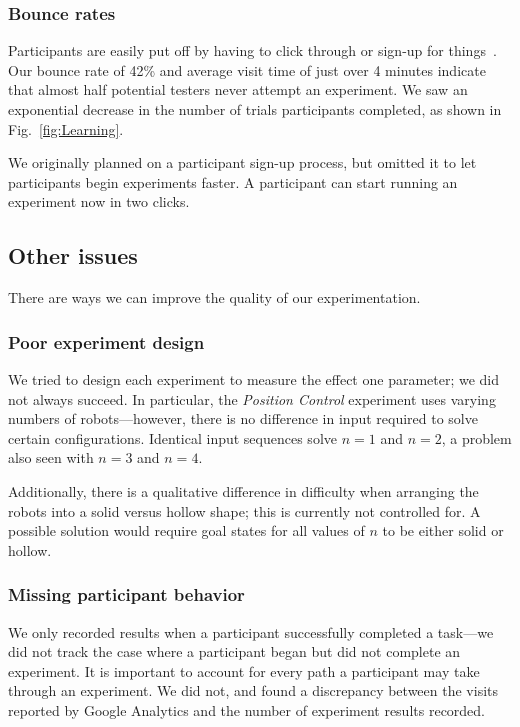 \subsubsection{Bounce rates}
Participants are easily put off by having to click through or sign-up for things~\cite{krug2009don}.  Our bounce rate of 42\% and average visit time of just over 4 minutes indicate that almost half potential testers never attempt an experiment. We saw an exponential decrease in the number of trials participants completed, as shown in Fig.~\ref{fig:Learning}.

We originally planned on a participant sign-up process, but omitted it to let participants begin experiments faster. A participant can start running an experiment now in two clicks.


\subsection{Other issues}

There are ways we can improve the quality of our experimentation.

\subsubsection{Poor experiment design}

We tried to design each experiment to measure the effect one parameter; we did not always succeed. In particular, the \emph{Position Control} experiment uses varying numbers of robots---however, there is no difference in input required to solve certain configurations. Identical input sequences solve $n=1$ and $n=2$, a problem also seen with $n=3$ and $n=4$.

Additionally, there is a qualitative difference in difficulty when arranging the robots into a solid versus hollow shape; this is currently not controlled for. A possible solution would require goal states for all values of $n$ to be either solid or hollow.

\subsubsection{Missing participant behavior}

We only recorded results when a participant successfully completed a task---we did not track the case where a participant began but did not complete an experiment. It is important to account for every path a participant may take through an experiment. We did not, and found a discrepancy between the visits reported by Google Analytics and the number of experiment results recorded.
